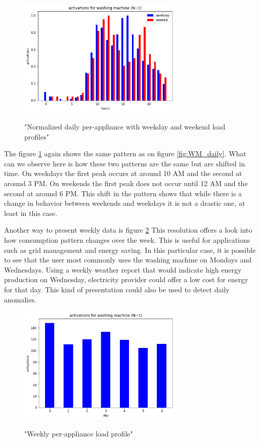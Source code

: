 \begin{figure}[H]
	\centering
	\caption{"Normalized daily per-appliance with weekday and weekend load profiles"}
	\includegraphics[width=0.7\textwidth]{../Figures/LPS/WM_ww_daily.png}
	\label{fig:WM_ww_daily}
\end{figure}

The figure \ref{fig:WM_ww_daily} again shows the same pattern as on figure \ref{fig:WM_daily}.
What can we observe here is how these two patterns are the same but are shifted in time. 
On weekdays the first peak occurs at around 10 AM and the second at around 3 PM.
On weekends the first peak does not occur until 12 AM and the second at around 6 PM.
This shift in the pattern shows that while there is a change in behavior between weekends and weekdays it is not a
drastic one, at least in this case. 

Another way to present weekly data is figure \ref{fig:WM_weekly}
This resolution offers a look into how consumption pattern changes over
the week. This is useful for applications such as grid management and energy saving.
In this particular case, it is possible to see that the user most commonly uses the washing machine on Mondays and Wednesdays.
Using a weekly weather report that would indicate high energy production on Wednesday, electricity provider could offer a low cost for energy for that day. 
This kind of presentation could also be used to detect daily anomalies.

\begin{figure}[H]
	\centering
	\caption{"Weekly per-appliance load profile"}
	\includegraphics[width=0.7\textwidth]{../Figures/LPS/WM_weekly.png}
	\label{fig:WM_weekly}
\end{figure}

